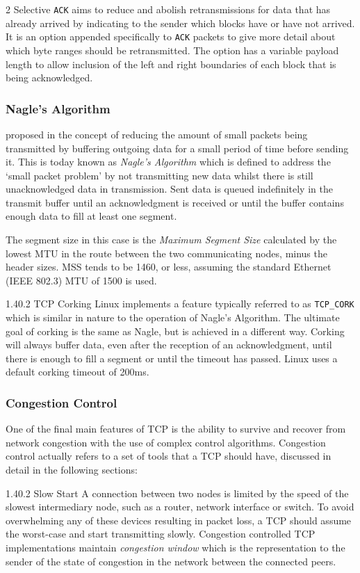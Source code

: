 \documentclass[11pt,a4paper,british]{bhamarticle}
\makeatletter
\newcounter{subsubsubsection}[subsubsection]
\newcommand\subsubsubsection{%
    \@startsection{subsubsubsection}{4}
        {\z@}{1.4\parskip}{0.2\parskip}
        {\normalfont\normalsize\bfseries}
}
\makeatother
\begin{document}
\begin{multicols}{2}
Selective \texttt{ACK} aims to reduce and abolish retransmissions for data that has already arrived by indicating to the sender which blocks have or have not arrived. It is an option appended specifically to \texttt{ACK} packets to give more detail about which byte ranges should be retransmitted. The option has a variable payload length to allow inclusion of the left and right boundaries of each block that is being acknowledged.

\subsubsection{Nagle's Algorithm}
\citeauthor{rfc896} proposed in \citeyear{rfc896} the concept of reducing the amount of small packets being transmitted by buffering outgoing data for a small period of time before sending it. This is today known as \textit{Nagle's Algorithm} which is defined to address the `small packet problem' by not transmitting new data whilst there is still unacknowledged data in transmission. Sent data is queued indefinitely in the transmit buffer until an acknowledgment is received or until the buffer contains enough data to fill at least one segment.

The segment size in this case is the \textit{Maximum Segment Size} calculated by the lowest MTU in the route between the two communicating nodes, minus the header sizes. MSS tends to be 1460, or less, assuming the standard Ethernet (IEEE 802.3) MTU of 1500 is used.

\subsubsubsection{TCP Corking}
Linux implements a feature typically referred to as \texttt{TCP\_CORK} which is similar in nature to the operation of Nagle's Algorithm. The ultimate goal of corking is the same as Nagle, but is achieved in a different way. Corking will always buffer data, even after the reception of an acknowledgment, until there is enough to fill a segment or until the timeout has passed.  Linux uses a default corking timeout of 200ms.

\subsubsection{Congestion Control}
One of the final main features of TCP is the ability to survive and recover from network congestion with the use of complex control algorithms. Congestion control actually refers to a set of tools that a TCP should have, discussed in detail in the following sections:

\subsubsubsection{Slow Start}
A connection between two nodes is limited by the speed of the slowest intermediary node, such as a router, network interface or switch. To avoid overwhelming any of these devices resulting in packet loss, a TCP should assume the worst-case and start transmitting slowly. Congestion controlled TCP implementations maintain \textit{congestion window} which is the representation to the sender of the state of congestion in the network between the connected peers.


\end{multicols}
\end{document}
